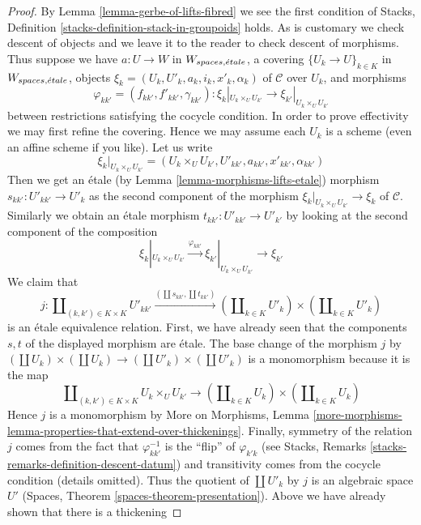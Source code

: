 \begin{proof}
By Lemma \ref{lemma-gerbe-of-lifts-fibred} we see the first condition
of Stacks, Definition \ref{stacks-definition-stack-in-groupoids} holds.
As is customary we check descent of objects and we leave it to the reader
to check descent of morphisms. Thus suppose we have $a : U \to W$
in $W_{spaces, {\acute{e}tale}}$, a covering $\{U_k \to U\}_{k \in K}$ in
$W_{spaces, {\acute{e}tale}}$, objects $\xi_k = (U_k, U'_k, a_k, i_k, x'_k, \alpha_k)$
of $\mathcal{C}$ over $U_k$, and morphisms
$$
\varphi_{kk'} = (f_{kk'}, f'_{kk'}, \gamma_{kk'}) :
\xi_k|_{U_k \times_U U_{k'}} \to
\xi_{k'}|_{U_k \times_U U_{k'}}
$$
between restrictions satisfying the cocycle condition. In order to prove
effectivity we may first refine the covering. Hence we may assume each
$U_k$ is a scheme (even an affine scheme if you like). Let us write
$$
\xi_k|_{U_k \times_U U_{k'}} =
(U_k \times_U U_{k'}, U'_{kk'}, a_{kk'}, x'_{kk'}, \alpha_{kk'})
$$
Then we get an \'etale (by Lemma \ref{lemma-morphisms-lifts-etale}) morphism
$s_{kk'} : U'_{kk'} \to U'_k$
as the second component of the morphism
$\xi_k|_{U_k \times_U U_{k'}} \to \xi_k$ of $\mathcal{C}$.
Similarly we obtain an \'etale morphism $t_{kk'} : U'_{kk'} \to U'_{k'}$
by looking at the second component of the composition
$$
\xi_k|_{U_k \times_U U_{k'}} \xrightarrow{\varphi_{kk'}}
\xi_{k'}|_{U_k \times_U U_{k'}} \to \xi_{k'}
$$
We claim that
$$
j :
\coprod\nolimits_{(k, k') \in K \times K} U'_{kk'}
\xrightarrow{(\coprod s_{kk'}, \coprod t_{kk'})}
(\coprod\nolimits_{k \in K} U'_k) \times (\coprod\nolimits_{k \in K} U'_k)
$$
is an \'etale equivalence relation. First, we have already seen
that the components $s, t$ of the displayed morphism are \'etale.
The base change of the morphism $j$ by
$(\coprod U_k) \times (\coprod U_k) \to (\coprod U'_k) \times (\coprod U'_k)$
is a monomorphism because it is the map
$$
\coprod\nolimits_{(k, k') \in K \times K} U_k \times_U U_{k'}
\longrightarrow
(\coprod\nolimits_{k \in K} U_k) \times (\coprod\nolimits_{k \in K} U_k)
$$
Hence $j$ is a monomorphism by More on Morphisms, Lemma
\ref{more-morphisms-lemma-properties-that-extend-over-thickenings}.
Finally, symmetry of the relation $j$ comes from the fact that
$\varphi_{kk'}^{-1}$ is the ``flip'' of $\varphi_{k'k}$ (see
Stacks, Remarks \ref{stacks-remarks-definition-descent-datum})
and transitivity comes from the cocycle condition (details omitted).
Thus the quotient of $\coprod U'_k$ by $j$ is an algebraic space $U'$
(Spaces, Theorem \ref{spaces-theorem-presentation}).
Above we have already shown that there is a thickening

\end{proof}
